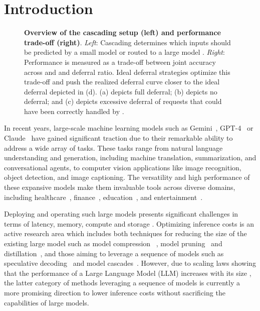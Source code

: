 \section{Introduction}

\begin{figure}[t]
\centering
    \subfigure{%
        \resizebox{0.35\linewidth}{!}{
    }
        \label{fig:cascade_schema}
    }
    \caption{\textbf{Overview of the cascading setup (left) and performance trade-off (right)}. \emph{Left}: Cascading determines which inputs should be predicted by a small model \smallmodel or routed to a large model \bigmodel. \emph{Right}: Performance is measured as a trade-off between joint accuracy across \smallmodel and \bigmodel and deferral ratio. Ideal deferral strategies optimize this trade-off and push the realized deferral curve closer to the ideal deferral depicted in (d). (a) depicts full deferral; (b) depicts no deferral; and (c) depicts excessive deferral of requests that could have been correctly handled by \smallmodel.
    }
    
    \label{fig:deferral_example_intro}
\end{figure}

In recent years, large-scale machine learning models such as Gemini~\citep{team2023gemini}, GPT-4~\citep{achiam2023gpt} or Claude~\citep{antropicmodels} have gained significant traction due to their remarkable ability to address a wide array of tasks. These tasks range from natural language understanding and generation, including machine translation, summarization, and conversational agents, to computer vision applications like image recognition, object detection, and image captioning. The versatility and high performance of these expansive models make them invaluable tools across diverse domains, including healthcare~\citep{llm_healthcare}, finance~\citep{llm_finance}, education~\citep{llm_education}, and entertainment~\citep{llm_games}.

\sloppy
Deploying and operating such large models presents significant challenges in terms of latency, memory, compute and storage \citep{MLSYS2023_c4be71ab}. Optimizing inference costs is an active research area which includes both techniques for reducing the size of the existing large model such as model compression ~\citep{hoefler2021sparsity}, model pruning~\citep{ma2023llmpruner, pruning_survey} and distillation~\citep{knowledgedistilation_survey}, and those aiming to leverage a sequence of models such as speculative decoding~\citep{leviathan2023fast} and model cascades~\citep{dohan2022language, CheZahZou2023,gupta2024languagemodelcascadestokenlevel,Chen:2024}. However, due to scaling laws showing that the performance of a Large Language Model (LLM) increases with its size \citep{kaplan2020scaling}, the latter category of methods leveraging a sequence of models is currently a more promising direction to lower inference costs without sacrificing the capabilities of large models.

